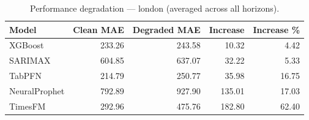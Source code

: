 \begin{table}[h]
\centering
\caption{Performance degradation — london (averaged across all horizons).}
\label{tab:degradation_summary_london}
\begin{tabular}{lrrrr}
\toprule
Model & Clean MAE & Degraded MAE & Increase & Increase \% \\
\midrule
XGBoost & 233.26 & 243.58 & 10.32 & 4.42 \\
SARIMAX & 604.85 & 637.07 & 32.22 & 5.33 \\
TabPFN & 214.79 & 250.77 & 35.98 & 16.75 \\
NeuralProphet & 792.89 & 927.90 & 135.01 & 17.03 \\
TimesFM & 292.96 & 475.76 & 182.80 & 62.40 \\
\bottomrule
\end{tabular}
\end{table}
